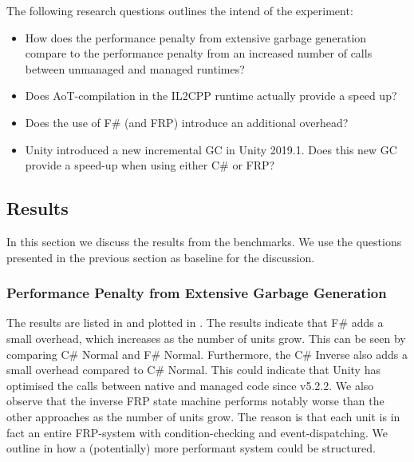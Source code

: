 The following research questions outlines the intend of the experiment:
\begin{itemize}
    \item How does the performance penalty from extensive garbage generation compare to the performance penalty from an increased number of calls between unmanaged and managed runtimes?
    \item Does \gls{AoT}-compilation in the IL2CPP runtime actually provide a speed up?
    \item Does the use of F\# (and \gls{FRP}) introduce an additional overhead?
    \item Unity introduced a new incremental \gls{GC} in Unity 2019.1. Does this new \gls{GC} provide a speed-up when using either C\# or \gls{FRP}?
\end{itemize}

\subsection{Results}
In this section we discuss the results from the benchmarks. We use the questions presented in the previous section as baseline for the discussion.

\subsubsection{Performance Penalty from Extensive Garbage Generation}
The results are listed in  and plotted in . The results indicate that F\# adds a small overhead, which increases as the number of units grow. This can be seen by comparing C\# Normal and F\# Normal. Furthermore, the C\# Inverse also adds a small overhead compared to C\# Normal. This could indicate that Unity has optimised the calls between native and managed code since v5.2.2. We also observe that the inverse FRP state machine performs notably worse than the other approaches as the number of units grow. The reason is that each unit is in fact an entire \gls{FRP}-system with condition-checking and event-dispatching. We outline in  how a (potentially) more performant system could be structured.

\begin{table}[H]
    \caption{Average framerate when simulating the given number of units in Unity's Mono runtime.}
    \label{tab:unity:ai}
\end{table}

